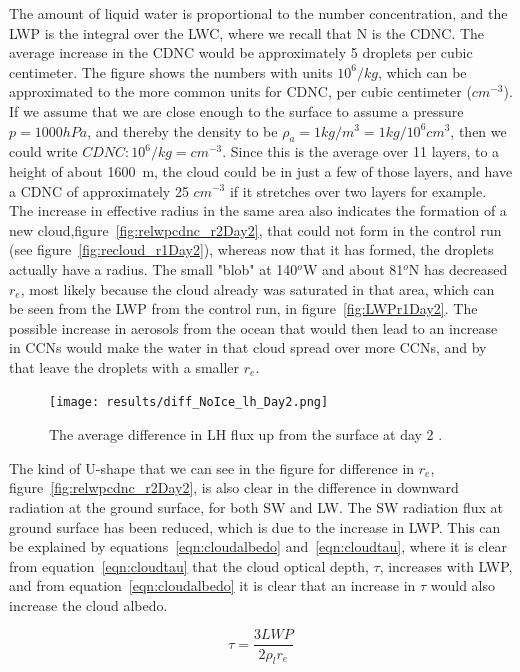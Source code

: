 The amount of liquid water is proportional to the number concentration, and the LWP is the integral over the LWC, where we recall that N is the CDNC. The average increase in the CDNC would be approximately 5 droplets per cubic centimeter. The figure shows the numbers with units $10^6/kg$, which can be approximated to the more common units for CDNC, per cubic centimeter ($cm^{-3}$). If we assume that we are close enough to the surface to assume a pressure $p=1000hPa$, and thereby the density to be $\rho_a = 1kg/m^3=1kg/10^6cm^3$, then we could write $CDNC : 10^6/kg = cm^{-3}$. Since this is the average over 11 layers, to a height of about 1600~m, the cloud could be in just a few of those layers, and have a CDNC of approximately 25 $cm^{-3}$ if it stretches over two layers for example. The increase in effective radius in the same area also indicates the formation of a new cloud,figure~\ref{fig:relwpcdnc_r2Day2}, that could not form in the control run (see figure~\ref{fig:recloud_r1Day2}), whereas now that it has formed, the droplets actually have a radius. The small "blob" at 140$^o$W and about 81$^o$N has decreased $r_e$, most likely because the cloud already was saturated in that area, which can be seen from the LWP from the control run, in figure~\ref{fig:LWPr1Day2}. The possible increase in aerosols from the ocean that would then lead to an increase in CCNs would make the water in that cloud spread over more CCNs, and by that leave the droplets with a smaller $r_e$.

\begin{figure}
\centering
\texttt{[image: results/diff\_NoIce\_lh\_Day2.png]}
\caption{The average difference in LH flux up from the surface at day 2 .}
\label{fig:lhdiff_r2Day2}
\end{figure}


The kind of U-shape that we can see in the figure for difference in $r_e$, figure~\ref{fig:relwpcdnc_r2Day2}, is also clear in the difference in downward radiation at the ground surface, for both SW and LW. The SW radiation flux at ground surface has been reduced, which is due to the increase in LWP. This can be explained by equations~\ref{eqn:cloudalbedo} and~\ref{eqn:cloudtau}, where it is clear from equation~\ref{eqn:cloudtau} that the cloud optical depth, $\tau$, increases with LWP, and from equation~\ref{eqn:cloudalbedo} it is clear that an increase in $\tau$ would also increase the cloud albedo.

\begin{equation}
\tau = \frac{3LWP}{2\rho_l r_e}
\label{eqn:cloudtau}
\end{equation}


